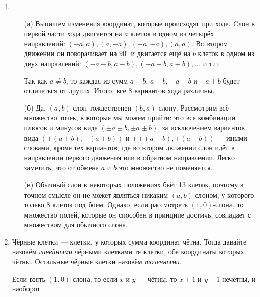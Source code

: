 
\begin{enumerate}

\item \begin{itemize}
\item[(а)] Выпишем изменения координат, которые происходят при ходе. 
Cлон в первой части хода двигается на $a$ клеток 
в одном из четырёх направлений: $(-a,a), (a,-a), (-a,-a), (a,a)$. Во втором 
движении он поворачивает на $90^\circ$ и двигается ещё на $b$ клеток в одном
из двух направлений: $(-a-b,a-b), (-a+b,a+b), \ldots$ и т.п.

Так как $a\ne b$, то каждая из сумм $a+b$, $a-b$, $-a-b$ и $-a+b$ будет отличаться
от других. Итого, все 8 вариантов хода различны.

\item[(б)] Да, $(a,b)$-слон тождественен $(b,a)$-слону. Рассмотрим всё множество точек,
в которые мы можем прийти: это все комбинации плюсов и минусов вида
$(\pm a \pm b, \pm a \pm b)$, за исключением
вариантов вида $(\pm (a+b), \pm (a+b))$ и $(\pm (a-b), \pm (a-b))$
--- иными словами, кроме тех вариантов, где во втором движении слон идёт в направлении
первого движения или в обратном направлении. Легко заметить, что от обмена
$a$ и $b$ это множество не поменяется.

\item[(в)] Обычный слон в некоторых положениях бьёт 13 клеток, поэтому в точном смысле он
не может являться никаким $(a,b)$-слоном, у которого только 8 клеток под боем. Однако,
если рассмотреть $(1,0)$-слона, то множество полей, которые он способен в принципе достичь,
совпадает с множеством для обычного слона.
\end{itemize}

\item Чёрные клетки --- клетки, у которых сумма координат чётна. Тогда давайте
назовём \emph{линейными} чёрными клетками те клетки, обе координаты которых чётны. 
Остальные чёрные клетки назовём \emph{точечными}. 

Если взять $(1,0)$-слона, то если $x$ и $y$ --- чётны, то $x \pm 1$ и $y \pm 1$ нечётны,
и наоборот.

\begin{center}\end{center}


\end{enumerate}
